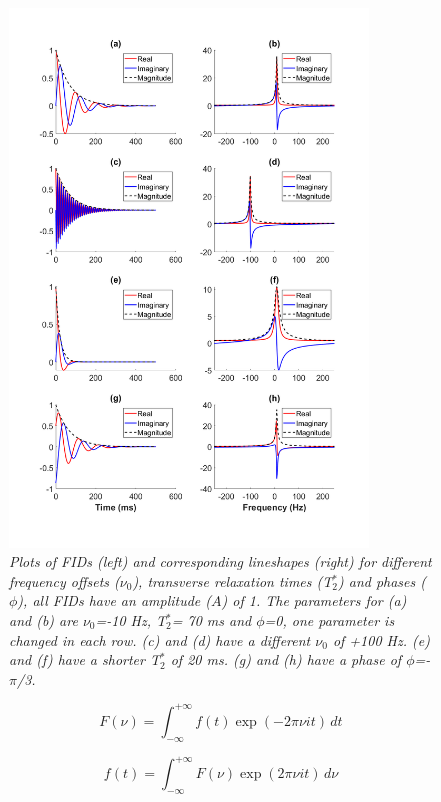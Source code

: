 \begin{figure}
    \centering
    \includegraphics[width=0.85\textwidth]{Figures/Theory/FID_Lorentz.png}
    \caption{\textit{Plots of \ac{FID}s (left) and corresponding lineshapes (right) for different frequency offsets ($\nu_0$), transverse relaxation times (T$_2^*$) and phases ($\phi$), all FIDs have an amplitude ($A$) of 1. The parameters for (a) and (b) are $\nu_0$=-10 Hz, T$_2^*$= 70 ms and $\phi$=0, one parameter is changed in each row. (c) and (d) have a different $\nu_0$ of +100 Hz. (e) and (f) have a shorter T$_2^*$ of 20 ms. (g) and (h) have a phase of $\phi$=-$\pi$/3.}}
    \label{fig:theory:FID_Lorentz}
\end{figure}

\begin{equation}
    F(\nu) = \int_{-\infty}^{+\infty} f(t)\exp(-2 \pi \nu i t) \, dt
    \label{eqn:theory:fourier}
\end{equation}

\begin{equation}
    f(t) = \int_{-\infty}^{+\infty} F(\nu)\exp(2 \pi \nu i t) \, d\nu
    \label{eqn:theory:inverse}
\end{equation}

